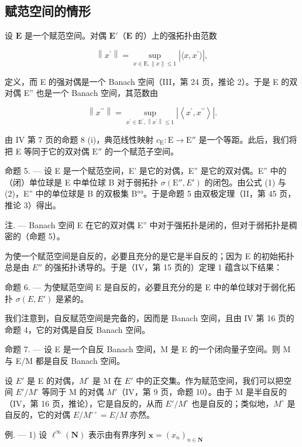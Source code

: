 \subsection{赋范空间的情形}

设 \(\mathbf{E}\) 是一个赋范空间。对偶 \(\mathbf{E}'\)（\(\mathbf{E}\) 的）上的强拓扑由范数

\[
\left\| x ^ {\prime} \right\| = \sup _ {x \in \mathrm{E}, \| x \| \leqslant 1} \left| \langle x, x ^ {\prime} \rangle \right|,\tag{1}
\]

定义，而 E 的强对偶是一个 Banach 空间（III，第 24 页，推论 2）。于是 E 的双对偶 E'' 也是一个 Banach 空间，其范数由

\[
\left\| x ^ {\prime \prime} \right\| = \sup _ {x ^ {\prime} \in \mathrm{E} ^ {\prime}, \left\| x ^ {\prime} \right\| \leqslant 1} \left| \left\langle x ^ {\prime}, x ^ {\prime \prime} \right\rangle \right|.\tag{2}
\]

由 IV 第 7 页的命题 8 (i)，典范线性映射 \(c_{\mathrm{E}}: \mathrm{E} \to \mathrm{E}''\) 是一个等距。此后，我们将把 E 等同于它的双对偶 \(\mathrm{E}''\) 的一个赋范子空间。

命题 5. --- 设 E 是一个赋范空间，E' 是它的对偶，E'' 是它的双对偶。E'' 中的（闭）单位球是 E 中单位球 B 对于弱拓扑 \(\sigma(\mathrm{E}'', E')\) 的闭包。由公式 (1) 与 (2)，E'' 中的单位球是 B 的双极集 B°°。于是命题 5 由双极定理（II，第 45 页，推论 3）得出。

注. --- Banach 空间 E 在它的双对偶 E'' 中对于强拓扑是闭的，但对于弱拓扑是稠密的（命题 5）。

为使一个赋范空间是自反的，必要且充分的是它是半自反的；因为 E 的初始拓扑总是由 \(E''\) 的强拓扑诱导的。于是（IV，第 15 页的）定理 1 蕴含以下结果：

命题 6. --- 为使赋范空间 E 是自反的，必要且充分的是 E 中的单位球对于弱化拓扑 \(\sigma(E, E')\) 是紧的。

我们注意到，自反赋范空间是完备的，因而是 Banach 空间，且由 IV 第 16 页的命题 4，它的对偶是自反 Banach 空间。

命题 7. --- 设 E 是一个自反 Banach 空间，M 是 E 的一个闭向量子空间。则 M 与 E/M 都是自反 Banach 空间。

设 \(E'\) 是 E 的对偶，\(M^{\circ}\) 是 M 在 \(E'\) 中的正交集。作为赋范空间，我们可以把空间 \(E'/M^{\circ}\) 等同于 M 的对偶 \(M'\)（IV，第 9 页，命题 10）。由于 M 是半自反的（IV，第 16 页，推论），它是自反的，从而 \(E'/M^{\circ}\) 也是自反的；类似地，\(M^{\circ}\) 是自反的，它的对偶 \(E/M^{\circ\circ} = E/M\) 亦然。

例. --- 1) 设 \(\ell^{\infty}(\mathbf{N})\) 表示由有界序列 \(\mathbf{x} = (x_n)_{n\in \mathbf{N}}\)

